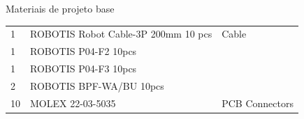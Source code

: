 \begin{frame}[c]{Materiais de projeto base}
\begin{center}
\begin{table}[]
\begin{tabular}{lll}
    \rowcolor[HTML]{FCFCFC} 
    {\color[HTML]{404040} 1}             & {\color[HTML]{404040} ROBOTIS Robot Cable-3P 200mm 10 pcs} & {\color[HTML]{404040} Cable}                 \\
    \rowcolor[HTML]{F3F6F6} 
    {\color[HTML]{404040} 1}             & {\color[HTML]{404040} ROBOTIS P04-F2 10pcs}                & {\color[HTML]{404040} }                      \\
    \rowcolor[HTML]{FCFCFC} 
    {\color[HTML]{404040} 1}             & {\color[HTML]{404040} ROBOTIS P04-F3 10pcs}                & {\color[HTML]{404040} }                      \\
    \rowcolor[HTML]{F3F6F6} 
    {\color[HTML]{404040} 2}             & {\color[HTML]{404040} ROBOTIS BPF-WA/BU 10pcs}             & {\color[HTML]{404040} }                      \\
    \rowcolor[HTML]{FCFCFC} 
    {\color[HTML]{404040} 10}            & {\color[HTML]{404040} MOLEX 22-03-5035}                    & {\color[HTML]{404040} PCB Connectors}       
    \end{tabular}
    \end{table}
   \end{center}

 \end{frame}
